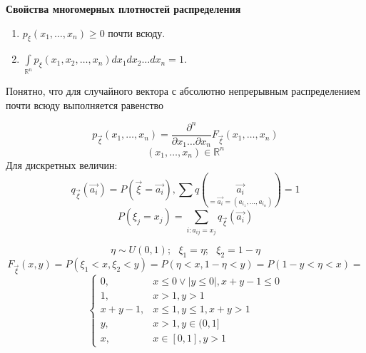 \begin{center}
	\textbf{Свойства многомерных плотностей распределения}
\end{center}
\begin{enumerate}
	\item $p_{\xi} (x_1, \dots, x_n) \ge 0$ почти всюду.
	\item $\int\limits_{\mathbb{R}^n} p_{\xi} (x_1, x_2, \dots, x_n) dx_1 dx_2 \dots dx_n = 1$.
\end{enumerate}
Понятно, что для случайного вектора с абсолютно непрерывным распределением почти всюду выполняется равенство

\[ p_{\vec{\xi}} (x_1, \dots, x_n) = \dfrac{\partial^n}{\partial x_1 \dots \partial x_n} F_{\vec{\xi}} (x_1, \dots, x_n) \]
\[ (x_1, \dots, x_n) \in \mathbb{R}^n \]
Для дискретных величин:
\[ q_{\vec{\xi}} (\vec{a_i}) = P(\vec{\xi} = \vec{a_i}), \sum q (\underset{= \vec{a_i} = (a_{i_1}, \dots, a_{i_n})}{\vec{a_i}}) = 1 \]
\[ P(\xi_j = x_j) = \sum_{i: a_{ij} = x_j} q_{\vec{\xi}} (\vec{a_i}) \]

\begin{definition}
	\[ \eta \sim U(0, 1); ~~~ \xi_1 = \eta; ~~~ \xi_2 = 1 - \eta \]
	\[ F_{\vec{\xi}} (x, y) = P(\xi_1 < x, \xi_2 < y) = P(\eta < x, 1 - \eta < y) = P(1 - y < \eta < x) = \]
	\[
	\begin{cases}
		0, & x \le 0 \lor |y \le 0|, x + y - 1 \le 0 \\
		1, & x > 1, y > 1 \\
		x + y - 1, & x \le 1, y \le 1, x + y > 1 \\
		y, & x > 1, y \in (0, 1] \\
		x, & x \in [0, 1], y > 1
	\end{cases}
	\]
	\begin{figure}[H]
	\end{figure}
\end{definition}

